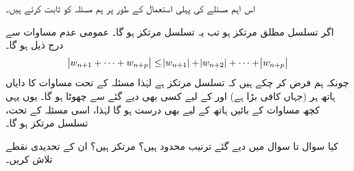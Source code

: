 اس اہم مسئلے کی پہلی استعمال کے طور پر ہم مسئلہ  کو ثابت کرتے ہیں۔

\quad
اگر تسلسل  مطلق مرتکز ہو تب یہ تسلسل مرتکز ہو گا۔
\quad
عمومی عدم مساوات  سے درج ذیل ہو گا۔
\begin{align}\label{مساوات_ترتیب_مطلق_مرتکز_اور_مرتکز_الف}
\abs{w_{n+1}+\cdots+w_{n+p}}\le \abs{w_{n+1}}+\abs{w_{n+2}}+\cdots+\abs{w_{n+p}}
\end{align}
چونکہ ہم فرض کر چکے ہیں کہ تسلسل  مرتکز ہے  لہٰذا مسئلہ  کے تحت  مساوات  کا دایاں ہاتھ   ہر  (جہاں  کافی بڑا ہے) اور  کے لیے کسی بھی دیے گئے  سے چھوٹا ہو گا۔ یوں یہی کچھ مساوات  کے بائیں ہاتھ کے لیے بھی درست ہو گا لہٰذا، اسی مسئلہ کے تحت، تسلسل  مرتکز ہو گا۔

 کیا سوال  تا سوال  میں دیے گئے  ترتیب  محدود ہیں؟ مرتکز ہیں؟ ان کے تحدیدی نقطے تلاش کریں۔ 

